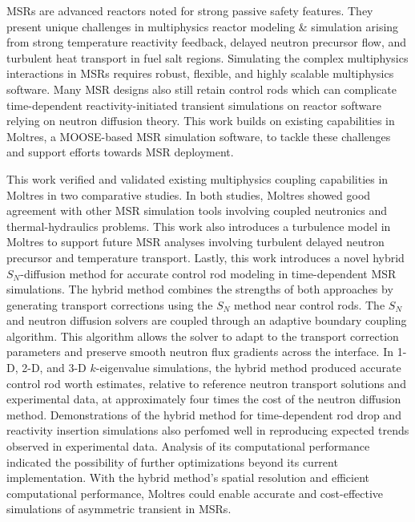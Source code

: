 \glspl{MSR} are advanced reactors noted for strong passive safety features.
They present unique challenges in multiphysics reactor modeling \& simulation arising from
strong temperature reactivity feedback, delayed neutron precursor flow, and turbulent heat transport
in fuel salt regions. Simulating the complex multiphysics interactions in
\glspl{MSR} requires robust, flexible, and highly scalable multiphysics software. Many \gls{MSR}
designs also still retain control rods which can complicate time-dependent reactivity-initiated
transient simulations on reactor software relying on neutron diffusion theory.
This work builds on existing capabilities in Moltres, a MOOSE-based \gls{MSR} simulation software,
to tackle these challenges and support efforts towards \gls{MSR} deployment.

This work verified and validated existing multiphysics coupling capabilities in Moltres in two
comparative studies. In both studies, Moltres showed good agreement with other \gls{MSR} simulation tools
involving coupled neutronics and thermal-hydraulics problems. This work also introduces a
turbulence model in Moltres to support future \gls{MSR} analyses involving turbulent delayed
neutron precursor and temperature transport. Lastly, this work introduces a novel hybrid
$S_N$-diffusion method for accurate control rod modeling in time-dependent \gls{MSR} simulations.
The hybrid method combines the strengths of both approaches by generating transport corrections
using the $S_N$ method near control rods. The $S_N$ and neutron diffusion solvers are coupled
through an adaptive boundary coupling algorithm. This algorithm allows the solver to adapt to the
transport correction parameters and preserve smooth neutron flux gradients across the interface.
In 1-D, 2-D, and 3-D $k$-eigenvalue simulations, the hybrid method produced accurate control
rod worth estimates, relative to reference neutron transport solutions and experimental data,
at approximately four times the cost of the neutron diffusion method.
Demonstrations of the hybrid method for time-dependent rod drop and reactivity insertion
simulations also perfomed well in reproducing expected trends observed in experimental data.
Analysis of its computational performance indicated the possibility of further optimizations
beyond its current implementation. With the hybrid method's spatial resolution and
efficient computational performance, Moltres could enable accurate and cost-effective simulations
of asymmetric transient in \glspl{MSR}.
